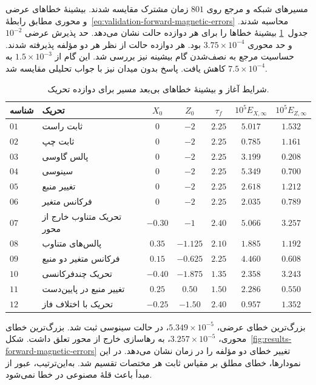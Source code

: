 مسیرهای شبکه و مرجع روی $801$ زمان مشترک مقایسه شدند.
بیشینهٔ خطاهای عرضی و محوری مطابق رابطهٔ~\eqref{eq:validation-forward-magnetic-errors} محاسبه شدند.
جدول~\ref{tab:results-forward-magnetic-errors} بیشینهٔ خطاها را برای هر دوازده حالت نشان می‌دهد.
حد پذیرش عرضی $10^{-2}$ و حد محوری $3.75\times10^{-4}$ بود.
هر دوازده حالت از نظر هر دو مؤلفه پذیرفته شدند.
حساسیت مرجع به نصف‌شدن گام بیشینه نیز بررسی شد.
این گام از $1.5\times10^{-3}$ به $7.5\times10^{-4}$ کاهش یافت.
پاسخ بدون میدان نیز با جواب تحلیلی مقایسه شد.

\begin{table}[htbp]
\centering
\small
\setlength{\tabcolsep}{4pt}
\renewcommand{\arraystretch}{0.85}
\caption{شرایط آغاز و بیشینهٔ خطاهای بی‌بعد مسیر برای دوازده تحریک.}
\label{tab:results-forward-magnetic-errors}
\begin{tabular}{@{}llccccc@{}}
\hline
شناسه & تحریک & $X_0$ & $Z_0$ & $\tau_f$ &
$10^5 E_{X,\infty}$ & $10^5 E_{Z,\infty}$ \\
\hline
$01$ & ثابت راست & $0$ & $-2$ & $2.25$ & $5.017$ & $1.532$ \\
$02$ & ثابت چپ & $0$ & $-2$ & $2.25$ & $0.785$ & $1.161$ \\
$03$ & پالس گاوسی & $0$ & $-2$ & $2.25$ & $3.199$ & $0.208$ \\
$04$ & سینوسی & $0$ & $-2$ & $2.25$ & $5.349$ & $0.700$ \\
$05$ & تغییر منبع & $0$ & $-2$ & $2.25$ & $2.618$ & $1.212$ \\
$06$ & فرکانس متغیر & $0$ & $-2$ & $2.25$ & $2.035$ & $0.789$ \\
$07$ & تحریک متناوب خارج از محور & $-0.30$ & $-1$ & $2.40$ & $5.066$ & $3.257$ \\
$08$ & پالس‌های متناوب & $0.35$ & $-1.125$ & $2.10$ & $1.885$ & $1.192$ \\
$09$ & فرکانس متغیر دو منبع & $0.15$ & $-0.625$ & $2.25$ & $4.460$ & $0.608$ \\
$10$ & تحریک چندفرکانسی & $-0.40$ & $-1.875$ & $1.35$ & $2.358$ & $3.243$ \\
$11$ & تغییر منبع در پایین‌دست & $0.25$ & $0.50$ & $1.50$ & $2.286$ & $0.550$ \\
$12$ & تحریک با اختلاف فاز & $-0.25$ & $-1.50$ & $2.40$ & $0.957$ & $1.352$ \\
\hline
\end{tabular}
\end{table}

بزرگ‌ترین خطای عرضی، $5.349\times10^{-5}$، در حالت سینوسی ثبت شد.
بزرگ‌ترین خطای محوری، $3.257\times10^{-5}$، به رهاسازی خارج از محور تعلق داشت.
شکل~\ref{fig:results-forward-magnetic-errors} تغییر خطای دو مؤلفه را در زمان نشان می‌دهد.
در این نمودارها، خطای مطلق بر مقیاس ثابت هر مختصات تقسیم شد.
به‌این‌ترتیب، عبور از مبدأ باعث قلهٔ مصنوعی در خطا نمی‌شود.

